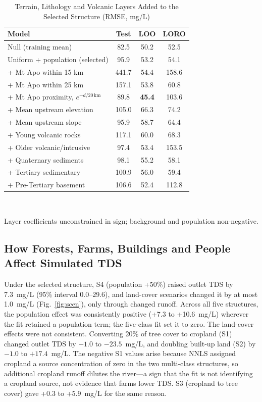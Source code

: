 \documentclass[10pt,twocolumn,letterpaper]{article}
\begin{document}
\begin{table}[!t]
\caption{Terrain, Lithology and Volcanic Layers Added to the Selected Structure (RMSE, mg/L)}
\label{tab:layers}
\centering\footnotesize
\setlength{\tabcolsep}{3pt}
\begin{tabular}{@{}lccc@{}}
\toprule
Model & Test & LOO & LORO\\
\midrule
Null (training mean) & 82.5 & 50.2 & 52.5\\
Uniform + population (selected) & 95.9 & 53.2 & 54.1\\
\quad + Mt Apo within 15 km & 441.7 & 54.4 & 158.6\\
\quad + Mt Apo within 25 km & 157.1 & 53.8 & 60.8\\
\quad + Mt Apo proximity, $e^{-d/20\,\mathrm{km}}$ & 89.8 & \textbf{45.4} & 103.6\\
\quad + Mean upstream elevation & 105.0 & 66.3 & 74.2\\
\quad + Mean upstream slope & 95.9 & 58.7 & 64.4\\
\quad + Young volcanic rocks & 117.1 & 60.0 & 68.3\\
\quad + Older volcanic/intrusive & 97.4 & 53.4 & 153.5\\
\quad + Quaternary sediments & 98.1 & 55.2 & 58.1\\
\quad + Tertiary sedimentary & 100.9 & 56.0 & 59.4\\
\quad + Pre-Tertiary basement & 106.6 & 52.4 & 112.8\\
\bottomrule
\end{tabular}\\[2pt]
\raggedright\scriptsize Layer coefficients unconstrained in sign; background and population non-negative.
\end{table}

\subsection{How Forests, Farms, Buildings and People Affect Simulated TDS}
Under the selected structure, S4 (population +50\%) raised outlet TDS by 7.3~mg/L (95\% interval 0.0--29.6), and land-cover scenarios changed it by at most 1.0~mg/L (Fig.~\ref{fig:scen}), only through changed runoff. Across all five structures, the population effect was consistently positive (+7.3 to +10.6~mg/L) wherever the fit retained a population term; the five-class fit set it to zero. The land-cover effects were not consistent. Converting 20\% of tree cover to cropland (S1) changed outlet TDS by $-1.0$ to $-23.5$~mg/L, and doubling built-up land (S2) by $-1.0$ to $+17.4$~mg/L. The negative S1 values arise because NNLS assigned cropland a source concentration of zero in the two multi-class structures, so additional cropland runoff dilutes the river---a sign that the fit is not identifying a cropland source, not evidence that farms lower TDS. S3 (cropland to tree cover) gave +0.3 to +5.9~mg/L for the same reason.
\end{document}
